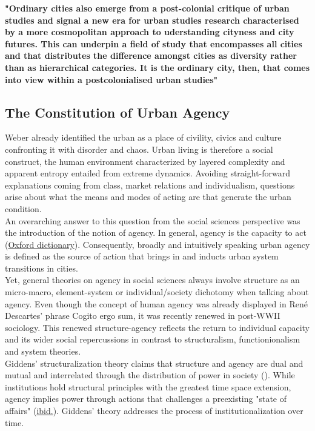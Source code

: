 \documentclass[11pt]{report}
\begin{document}
{{{\textbf{"Ordinary cities also emerge from a post-colonial critique of urban studies and signal a new era for urban studies research characterised by a more cosmopolitan approach to uderstanding cityness and city futures. This can underpin a field of study that encompasses all cities and that distributes the difference amongst cities as diversity rather than as hierarchical categories. It is the ordinary city, then, that comes into view within a postcolonialised urban studies" \href{ref}{\cite{robinson_ordinary_2006}}}

\subsection{The Constitution of Urban Agency}

Weber already identified the urban as a place of civility, civics and culture confronting it with disorder and chaos. Urban living is therefore a social construct, the human environment characterized by layered complexity and apparent entropy entailed from extreme dynamics.
Avoiding straight-forward explanations coming from class, market relations and individualism, questions arise about what the means and modes of acting are that generate the urban condition.
\\
An overarching answer to this question from the social sciences perspective was the introduction of the notion of agency.
In general, agency is the capacity to act (\href{Oxford}{Oxford dictionary}).
Consequently, broadly and intuitively speaking urban agency is defined as the source of action that brings in and inducts urban system transitions in cities.
\\

Yet, general theories on agency in social sciences always involve structure as an micro-macro, element-system or individual/society dichotomy when talking about agency.
Even though the concept of human agency was already displayed in René Descartes' phrase Cogito ergo sum, it was recently renewed in post-WWII sociology.
This renewed structure-agency reflects the return to individual capacity and its wider social repercussions in contrast to structuralism, functionionalism and system theories.
\\

Giddens' structuralization theory claims that structure and agency are dual and mutual and interrelated through the distribution of power in society (\href{Giddens}{\citealt{giddens_constitution_1984}}).
While institutions hold structural principles with the greatest time space extension, agency implies power through actions that challenges a preexisting "state of affairs" (\href{Giddens}{ibid.}).
Giddens' theory addresses the process of institutionalization over time.
\\

}}}
\end{document}
